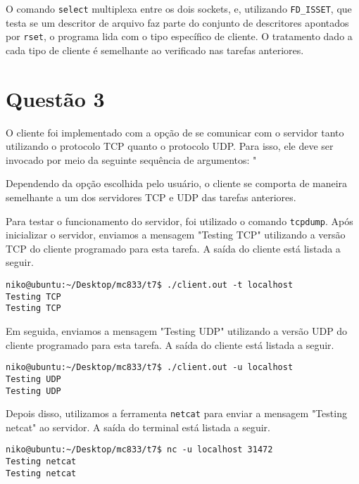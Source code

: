 \documentclass[a4paper,10pt]{article}
\begin{document}
O comando {\tt select} multiplexa entre os dois sockets, e, utilizando {\tt FD\_ISSET}, que testa se um descritor de arquivo faz parte do conjunto de descritores apontados por {\tt rset}, o programa lida com o tipo específico de cliente. O tratamento dado a cada tipo de cliente é semelhante ao verificado nas tarefas anteriores.

\section{Questão 3}

O cliente foi implementado com a opção de se comunicar com o servidor tanto utilizando o protocolo TCP quanto o protocolo UDP. Para isso, ele deve ser invocado por meio da seguinte sequência de argumentos: "%

Dependendo da opção escolhida pelo usuário, o cliente se comporta de maneira semelhante a um dos servidores TCP e UDP das tarefas anteriores.

Para testar o funcionamento do servidor, foi utilizado o comando {\tt tcpdump}. Após inicializar o servidor, enviamos a mensagem "Testing TCP" utilizando a versão TCP do cliente programado para esta tarefa. A saída do cliente está listada a seguir.

\begin{lstlisting}
niko@ubuntu:~/Desktop/mc833/t7$ ./client.out -t localhost
Testing TCP
Testing TCP

\end{lstlisting}


Em seguida, enviamos a mensagem "Testing UDP" utilizando a versão UDP do cliente programado para esta tarefa. A saída do cliente está listada a seguir.

\begin{lstlisting}
niko@ubuntu:~/Desktop/mc833/t7$ ./client.out -u localhost
Testing UDP
Testing UDP

\end{lstlisting}

Depois disso, utilizamos a ferramenta {\tt netcat} para enviar a mensagem "Testing netcat" ao servidor. A saída do terminal está listada a seguir.

\begin{lstlisting}
niko@ubuntu:~/Desktop/mc833/t7$ nc -u localhost 31472
Testing netcat
Testing netcat

\end{lstlisting}
\end{document}
